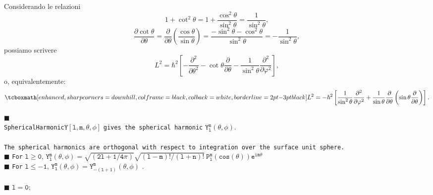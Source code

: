 Considerando le relazioni
	\begin{equation}
		1+ \cot ^2 \theta = 1+\frac{\cos ^2 \theta}{\sin ^2 \theta} = \frac{1}{\sin ^2 \theta},
	\end{equation}
	\begin{equation}
		\frac{\partial \cot \theta}{\partial \theta}= \frac{\partial}{\partial \theta}\left( \frac{\cos  \theta}{\sin \theta} \right) = \frac{-\sin ^ 2 \theta - \cos ^2 \theta}{\sin ^2 \theta}=-\frac{1}{\sin ^2 \theta},
	\end{equation}
possiamo scrivere
	\begin{equation}
		L^2 = \hbar ^2 \left[- \frac{\partial ^2}{\partial \theta ^2}-\cot \theta \frac{\partial}{\partial \theta}- \frac{1}{\sin ^2 \theta}\frac{\partial ^2}{\partial \varphi ^2}\right] ,
	\end{equation}
o, equivalentemente:
	\begin{equation}
		\tcboxmath[enhanced, sharp corners=downhill, colframe=black, colback=white, borderline={2pt}{-3pt}{black}]{
			L^2 = -\hbar ^2 \left[\frac{1}{\sin ^2 \theta}\frac{\partial ^2}{\partial \varphi ^2}+\frac{1}{\sin \theta}\frac{\partial}{\partial \theta} \left(\sin \theta \frac{\partial}{\partial \theta}\right)\right] .
			}
	\end{equation}
\newpage
\begin{tcolorbox}[sharp corners=downhill,colframe=black, colback=gray!50!white]
\begin{center}
\huge{\textbf{}} 
\end{center}
\end{tcolorbox}
$\blacksquare$ \textbf{\large{}}\\
\texttt{SphericalHarmonic}$\mathtt{Y[l,m,\theta,\phi]}$ \texttt{gives the spherical harmonic} $\mathtt{Y_l ^m (\theta,\phi)}$.\\
\\
\noindent \texttt{The spherical harmonics are orthogonal with respect to integration over the surface unit sphere.}\\
$\blacksquare$ \texttt{For} $\mathtt{l\geq 0}$, $\mathtt{\displaystyle{Y_l ^m (\theta,\phi)=\sqrt{(2l+1/4\pi)}\sqrt{(l-m)!/(l+n)!}\ P_l ^m (cos(\theta))e^{im\theta}}}$\\
$\blacksquare$ \texttt{For} $\mathtt{l\leq -1}$, $\mathtt{\displaystyle{Y_l ^m (\theta,\phi)=Y_{-(l+1)} ^m (\theta,\phi)}}$ .\\
\\
\noindent $\blacksquare$ $\mathtt{l=0};$\\
